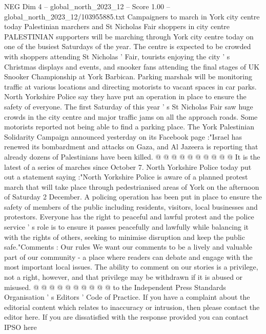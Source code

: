 \begin{textsample}{NEG Dim 4 – global\_north\_2023\_12 – Score 1.00 – global\_north\_2023\_12/103955885.txt}  \label{ex:f4_neg_143}
Campaigners to march in York city centre today Palestinian marchers and St Nicholas Fair shoppers in city centre PALESTINIAN supporters will be marching through York city centre today on one of the busiest Saturdays of the year.
The centre is expected to be crowded with shoppers attending St Nicholas ' Fair, tourists enjoying the city ' s Christmas displays and events, and snooker fans attending the final stages of UK Snooker Championship at York Barbican.
Parking marshals will be monitoring traffic at various locations and directing motorists to vacant spaces in car parks.
North Yorkshire Police say they have put an operation in place to ensure the safety of everyone.
The first Saturday of this year ' s St Nicholas Fair saw huge crowds in the city centre and major traffic jams on all the approach roads.
Some motorists reported not being able to find a parking place.
The York Palestinian Solidarity Campaign announced yesterday on its Facebook page :"Israel has renewed its bombardment and attacks on Gaza, and Al Jazeera is reporting that already dozens of Palestinians have been killed. @ @ @ @ @ @ @ @ @ @ It is the latest of a series of marches since October 7.
North Yorkshire Police today put out a statement saying :"North Yorkshire Police is aware of a planned protest march that will take place through pedestrianised areas of York on the afternoon of Saturday 2 December.
A policing operation has been put in place to ensure the safety of members of the public including residents, visitors, local businesses and protestors.
Everyone has the right to peaceful and lawful protest and the police service ' s role is to ensure it passes peacefully and lawfully while balancing it with the rights of others, seeking to minimise disruption and keep the public safe."Comments : Our rules We want our comments to be a lively and valuable part of our community - a place where readers can debate and engage with the most important local issues.
The ability to comment on our stories is a privilege, not a right, however, and that privilege may be withdrawn if it is abused or misused. @ @ @ @ @ @ @ @ @ @ to the Independent Press Standards Organisation ' s Editors ' Code of Practice.
If you have a complaint about the editorial content which relates to inaccuracy or intrusion, then please contact the editor here.
If you are dissatisfied with the response provided you can contact IPSO here

\end{textsample}
